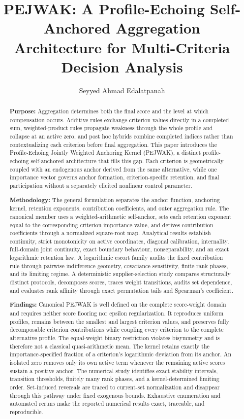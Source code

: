 \documentclass[reqno,11pt]{amsart}
\title{PEJWAK: A Profile-Echoing Self-Anchored Aggregation Architecture for Multi-Criteria Decision Analysis}
\author{Seyyed Ahmad Edalatpanah}
\theoremstyle{definition}
\theoremstyle{plain}
\theoremstyle{remark}
\begin{document}
\begin{abstract}
\textbf{Purpose:}
Aggregation determines both the final score and the level at which
compensation occurs. Additive rules exchange criterion values directly
in a completed sum, weighted-product rules propagate weakness through
the whole profile and collapse at an active zero, and post hoc hybrids
combine completed indices rather than contextualizing each criterion
before final aggregation. This paper introduces the Profile-Echoing
Jointly Weighted Anchoring Kernel (PEJWAK), a distinct profile-echoing
self-anchored architecture that fills this gap. Each criterion is
geometrically coupled with an endogenous anchor derived from the same
alternative, while one importance vector governs anchor formation,
criterion-specific retention, and final participation without a
separately elicited nonlinear control parameter.

\textbf{Methodology:}
The general formulation separates the anchor function, anchoring kernel,
retention exponents, contribution coefficients, and outer aggregation
rule. The canonical member uses a weighted-arithmetic self-anchor, sets
each retention exponent equal to the corresponding criterion-importance
value, and derives contribution coefficients through a normalized
square-root map. Analytical results establish continuity, strict
monotonicity on active coordinates, diagonal calibration, internality,
full-domain joint continuity, exact boundary behaviour, nonseparability,
and an exact logarithmic retention law. A logarithmic escort family
audits the fixed contribution rule through pairwise indifference
geometry, covariance sensitivity, finite rank phases, and its limiting
regime. A deterministic supplier-selection study compares structurally
distinct protocols, decomposes scores, traces weight transitions, audits
set dependence, and evaluates rank affinity through exact permutation
tails and Spearman's coefficient.

\textbf{Findings:}
Canonical PEJWAK is well defined on the complete score-weight domain and
requires neither score flooring nor epsilon regularization. It reproduces
uniform profiles, remains between the smallest and largest criterion
values, and preserves fully decomposable criterion contributions while
coupling every criterion to the complete alternative profile. The
equal-weight binary restriction violates bisymmetry and is therefore not
a classical quasi-arithmetic mean. The kernel retains exactly the
importance-specified fraction of a criterion's logarithmic deviation
from its anchor. An isolated zero removes only its own active term
whenever the remaining active scores sustain a positive anchor. The
numerical study identifies exact stability intervals, transition
thresholds, finitely many rank phases, and a kernel-determined limiting
order. Set-induced reversals are traced to current-set normalization and
disappear through this pathway under fixed exogenous bounds. Exhaustive
enumeration and automated reruns make the reported numerical results
exact, traceable, and reproducible.


\end{abstract}
\end{document}
